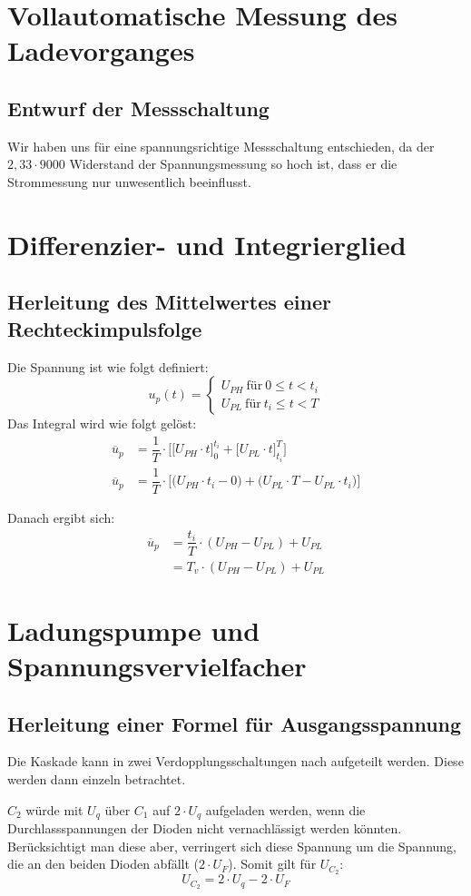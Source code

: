 \documentclass[
12pt,
a4paper,
headings=small,                    %
bibliography=totoc,                %
listof=totoc,                      %
parskip=half*,                     %
]{scrartcl}                        %
\newcommand{\laborsubsection}[2] {
    \renewcommand{\thesubsection}{#1 \thesection.\arabic{subsection}}
    \subsection{#2}
    \renewcommand{\thesubsection}{\thesection.\arabic{subsection}}
}
\begin{document}
%
%
\section{Vollautomatische Messung des Ladevorganges}
\laborsubsection{V}{Entwurf der Messschaltung}
Wir haben uns für eine spannungsrichtige Messschaltung entschieden, da der $ 2,33 \cdot 9000 $ Widerstand der Spannungsmessung so hoch ist, dass er die Strommessung nur unwesentlich beeinflusst.

\section{Differenzier- und Integrierglied}
\laborsubsection{V}{Herleitung des Mittelwertes einer Rechteckimpulsfolge}
Die Spannung ist wie folgt definiert:
\begin{equation}
    u_p (t) =
    \begin{cases}
        U_{PH} ~ \text{für} ~ 0 \le t < t_{i} \\
        U_{PL} ~ \text{für} ~ t_{i} \le t < T
    \end{cases}
\end{equation}
Das Integral wird wie folgt gelöst:
\begin{align}
    \overline{u}_p & = \dfrac{1}{T} \cdot \Bigg [ \big [ U_{PH} \cdot t \big     ]_0^{t_{i}}   +    \big [  U_{PL} \cdot t \big ]_{t_{i}}^T    \Bigg ] \\
    \overline{u}_p & = \dfrac{1}{T} \cdot  \Bigg [ \Big ( U_{PH} \cdot t_{i} - 0 \Big ) + \Big ( U_{PL} \cdot T - U_{PL} \cdot t_{i} \Big ) \Bigg ]
\end{align}

Danach ergibt sich:
\begin{align}
    \overline{u}_p & = \dfrac{t_{i}}{T} \cdot (U_{PH}-U_{PL}) + U_{PL} \\
                   & = T_{v} \cdot (U_{PH}-U_{PL}) + U_{PL}
\end{align}


\section{Ladungspumpe und Spannungsvervielfacher}
\laborsubsection{V}{Herleitung einer Formel für Ausgangsspannung}
Die Kaskade kann in zwei Verdopplungsschaltungen nach \autocite[42]{moeller} aufgeteilt werden. Diese werden dann einzeln betrachtet.

$C_2$ würde mit $U_q$ über $C_1$ auf $2\cdot U_{q}$ aufgeladen werden, wenn die Durchlassspannungen der Dioden nicht vernachlässigt werden könnten. Berücksichtigt man diese aber, verringert sich diese Spannung um die Spannung, die an den beiden Dioden abfällt ($ 2 \cdot U_{F} $). Somit gilt für $U_{C_2}$:
\begin{equation}
    U_{C_2} = 2 \cdot U_{q} - 2 \cdot U_{F}
\end{equation}
\end{document}
